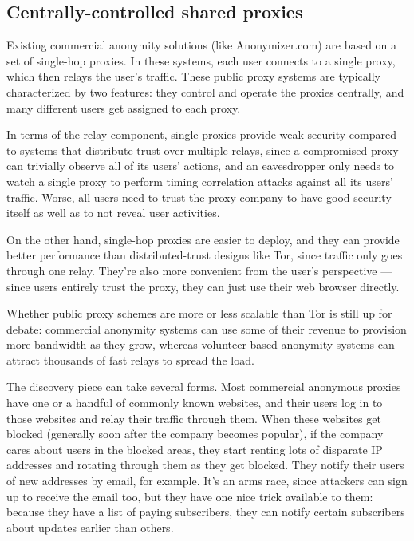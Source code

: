 \documentclass{llncs}
\begin{document}
\subsection{Centrally-controlled shared proxies}

Existing commercial anonymity solutions (like Anonymizer.com) are based
on a set of single-hop proxies. In these systems, each user connects to
a single proxy, which then relays the user's traffic. These public proxy
systems are typically characterized by two features: they control and
operate the proxies centrally, and many different users get assigned
to each proxy.

In terms of the relay component, single proxies provide weak security
compared to systems that distribute trust over multiple relays, since a
compromised proxy can trivially observe all of its users' actions, and
an eavesdropper only needs to watch a single proxy to perform timing
correlation attacks against all its users' traffic. Worse, all users
need to trust the proxy company to have good security itself as well as
to not reveal user activities.

On the other hand, single-hop proxies are easier to deploy, and they
can provide better performance than distributed-trust designs like Tor,
since traffic only goes through one relay. They're also more convenient
from the user's perspective --- since users entirely trust the proxy,
they can just use their web browser directly.

Whether public proxy schemes are more or less scalable than Tor is
still up for debate: commercial anonymity systems can use some of their
revenue to provision more bandwidth as they grow, whereas volunteer-based
anonymity systems can attract thousands of fast relays to spread the load.

The discovery piece can take several forms. Most commercial anonymous
proxies have one or a handful of commonly known websites, and their users
log in to those websites and relay their traffic through them. When
these websites get blocked (generally soon after the company becomes
popular), if the company cares about users in the blocked areas, they
start renting lots of disparate IP addresses and rotating through them
as they get blocked. They notify their users of new addresses by email,
for example. It's an arms race, since attackers can sign up to receive the
email too, but they have one nice trick available to them: because they
have a list of paying subscribers, they can notify certain subscribers
about updates earlier than others.
\end{document}
